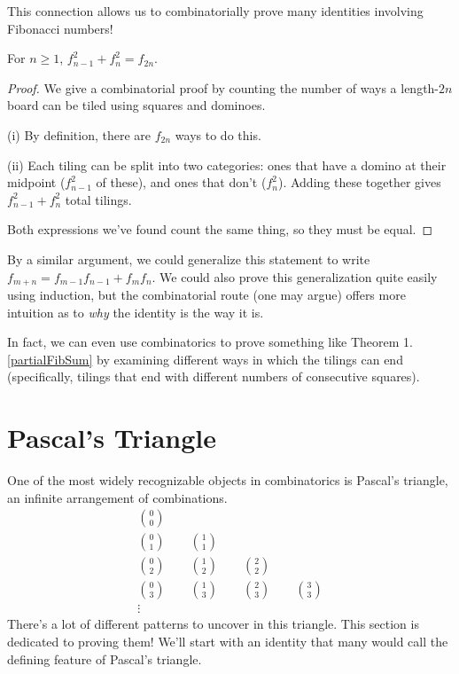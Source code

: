 \documentclass[../m055main.tex]{subfiles}
\begin{document}
This connection allows us to combinatorially prove many identities involving Fibonacci numbers!

\begin{theorem}
    For $n \geq 1$, $f_{n-1}^2 + f_n^2 = f_{2n}$.
\end{theorem}

\begin{proof}
    We give a combinatorial proof by counting the number of ways a length-$2n$ board can be tiled using squares and dominoes.
    \smallskip

    (i) By definition, there are $f_{2n}$ ways to do this.
    \smallskip

    (ii) Each tiling can be split into two categories: ones that have a domino at their midpoint ($f_{n-1}^2$ of these), and ones that don't ($f_n^2$).
    Adding these together gives $f_{n-1}^2 + f_n^2$ total tilings.

    \smallskip

    Both expressions we've found count the same thing, so they must be equal.
\end{proof}

By a similar argument, we could generalize this statement to write $f_{m+n} = f_{m-1} f_{n-1} + f_m f_n$.
We could also prove this generalization quite easily using induction, but the combinatorial route (one may argue) offers more intuition as to \textit{why} the identity is the way it is.

In fact, we can even use combinatorics to prove something like Theorem 1.\ref{partialFibSum} by examining different ways in which the tilings can end (specifically, tilings that end with different numbers of consecutive squares).

\section{Pascal's Triangle}
One of the most widely recognizable objects in combinatorics is Pascal's triangle, an infinite arrangement of combinations.
\begin{gather*}
    {0 \choose 0} \\
    {0 \choose 1} \qquad {1 \choose 1} \\
    {0 \choose 2} \qquad {1 \choose 2} \qquad {2 \choose 2} \\
    {0 \choose 3} \qquad {1 \choose 3} \qquad {2 \choose 3} \qquad {3 \choose 3} \\
    \vdots
\end{gather*}
There's a lot of different patterns to uncover in this triangle.
This section is dedicated to proving them!
We'll start with an identity that many would call the defining feature of Pascal's triangle.
\end{document}

